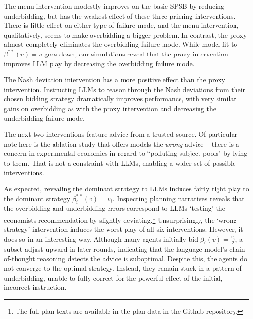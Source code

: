 \documentclass{article} %
\newcommand{\kibitz}[2]{\ifnum\Comments=1{\color{#1}{#2}}\fi}
\newcommand{\dcp}[1]{\kibitz{teal}{[DCP: #1]}}
\begin{document}
The menu intervention modestly improves on the basic SPSB by reducing underbidding, but has the weakest effect of these three priming interventions. There is little effect on either type of failure mode, and the menu intervention, qualitatively, seems to make overbidding a bigger problem.
In contrast, the proxy almost completely eliminates the overbidding failure mode. While model fit to $\beta^{**}(v) = v$ goes down, 
our simulations reveal that the proxy intervention improves LLM play by decreasing the overbidding failure mode.

The Nash deviation intervention has a more positive effect than  the proxy intervention. Instructing LLMs to reason through the Nash deviations from their chosen bidding strategy dramatically improves performance, with very similar gains on overbidding as with  the proxy intervention and 
 decreasing the underbidding failure mode.

The next two interventions feature advice from a trusted source. Of particular note here is the ablation study that offers models the \textit{wrong} advice -- there is  a concern in experimental economics in regard to ``polluting subject pools" by lying to them. That is not a constraint with LLMs, enabling a wider set of possible interventions. 

As expected, revealing the dominant strategy to LLMs induces fairly tight play to the dominant strategy $\beta_i^{**}(v) = v_i$. Inspecting planning narratives reveals that the overbidding and underbidding errors correspond to LLMs `testing' the economists recommendation by slightly deviating.\footnote{The full plan texts are available in the plan data in the Github repository.} 
Unsurprisingly, the `wrong strategy' intervention induces the worst play of all six interventions. However, it does so in an interesting way.
Although many agents initially bid $\beta_i(v) = \frac{v_i}{2}$, a subset adjust upward in later rounds, indicating that the language model’s chain-of-thought reasoning detects the advice is suboptimal. Despite this, the agents do not converge to the optimal strategy. Instead, they remain stuck in a pattern of underbidding, unable to fully correct for the powerful effect of the initial, incorrect instruction.
\end{document}
